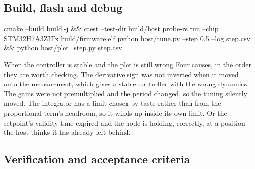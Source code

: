 
\subsection*{Build, flash and debug}


\begin{shellcode}
cmake --build build -j && ctest --test-dir build/host
probe-rs run --chip STM32H7A3ZITx build/firmware.elf
python host/tune.py --step 0.5 --log step.csv && python host/plot_step.py step.csv
\end{shellcode}

\begin{note}{When the controller is stable and the plot is still wrong}
Four causes, in the order they are worth checking. The derivative sign was not
inverted when it moved onto the measurement, which gives a stable controller
with the wrong dynamics. The gains were not premultiplied and the period changed,
so the tuning silently moved. The integrator has a limit chosen by taste rather
than from the proportional term's headroom, so it winds up inside its own limit.
Or the setpoint's validity time expired and the node is holding, correctly, at a
position the host thinks it has already left behind.
\end{note}

\subsection*{Verification and acceptance criteria}

